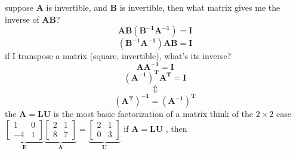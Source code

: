 \documentclass[12pt, a4paper]{article}
\begin{document}
{\noindent
suppose ${\mathbf{A}}$ is invertible, and ${\mathbf{B}}$ is invertible, then what matrix gives me the inverse of ${\mathbf{AB}}$?
\begin{displaymath}
	{\mathbf{A}}{\mathbf{B}}({\mathbf{B^{-1}}}{\mathbf{A^{-1}}}) = {\mathbf{I}}
\end{displaymath}
\begin{displaymath}
	({\mathbf{B^{-1}}}{\mathbf{A^{-1}}}){\mathbf{A}}{\mathbf{B}} = {\mathbf{I}}
\end{displaymath}
if I transpose a matrix (square, invertible), what's its inverse?
\begin{displaymath}
	{\mathbf{A}}{\mathbf{A^{-1}}} = {\mathbf{I}}
\end{displaymath}
\begin{displaymath}
	{\mathbf{(A^{-1})^{T}}}{\mathbf{A^{T}}} = {\mathbf{I}}
\end{displaymath}
\begin{displaymath}
	\Updownarrow
\end{displaymath}
\begin{displaymath}
	{\mathbf{(A^{T})^{-1}}} = {\mathbf{(A^{-1})^{T}}}
\end{displaymath}
the 
\begin{math}
	{\mathbf{A}}={\mathbf{L}}{\mathbf{U}}
\end{math}
 is the most basic factorization of a matrix
\vspace{14pt}
\newline
think of the $2 \times 2$ case
\newline
\begin{math}
	\underbrace{
		\begin{bmatrix}
			1 & 0 \\
			-4 & 1
		\end{bmatrix}
	}_{\mathbf{E}}
	\underbrace{
		\begin{bmatrix}
			2 & 1 \\
			8 & 7 
		\end{bmatrix}
	}_{\mathbf{A}}
	 = 
	\underbrace{
		\begin{bmatrix}
			2 & 1 \\
			0 & 3
		\end{bmatrix}
	}_{\mathbf{U}}
\end{math}
\newline
if 
\begin{math}
	{\mathbf{A}}={\mathbf{L}}{\mathbf{U}}
\end{math}
, then
\newline
\begin{math}

\end{math}}
\end{document}
